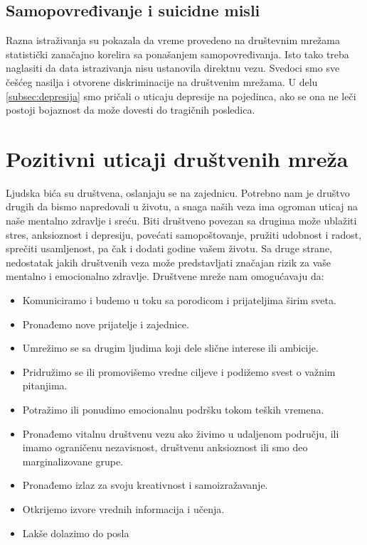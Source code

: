 \documentclass[a4paper]{article}
\begin{document}
{		\subsection{Samopovređivanje i suicidne misli}
		
		Razna istraživanja su pokazala da vreme provedeno na društevnim mrežama statistički zanačajno korelira sa ponašanjem samopovređivanja. Isto tako treba naglasiti da data istrazivanja nisu ustanovila direktnu vezu. Svedoci smo sve češćeg nasilja i otvorene diskriminacije na društvenim mrežama. U delu \eqref{subsec:depresija} smo pričali o uticaju depresije na pojedinca, ako se ona ne leči postoji bojaznost da može dovesti do tragičnih posledica.
		
		\section{Pozitivni uticaji društvenih mreža}	
		Ljudska bića su društvena, oslanjaju se na zajednicu. Potrebno nam je društvo drugih da bismo napredovali u životu, a snaga naših veza ima ogroman uticaj na naše mentalno zdravlje i sreću. Biti društveno povezan sa drugima može ublažiti stres, anksioznost i depresiju, povećati samopoštovanje, pružiti udobnost i radost, sprečiti usamljenost, pa čak i dodati godine vašem životu. Sa druge strane, nedostatak jakih društvenih veza može predstavljati značajan rizik za vaše mentalno i emocionalno zdravlje. Društvene mreže nam omogućavaju da:
		\begin{itemize}
		\item	Komuniciramo i budemo u toku sa porodicom i prijateljima širim sveta.
		\item Pronađemo nove prijatelje i zajednice.
		\item Umrežimo se sa drugim ljudima koji dele slične interese ili ambicije.
		\item Pridružimo se ili promovišemo vredne ciljeve i podižemo svest o važnim pitanjima.
		\item Potražimo ili ponudimo emocionalnu podršku tokom teških vremena.
		\item Pronađemo vitalnu društvenu vezu ako živimo u udaljenom području, ili imamo ograničenu nezavisnost, društvenu anksioznost ili smo deo marginalizovane grupe.
		\item Pronađemo izlaz za svoju kreativnost i samoizražavanje.
		\item Otkrijemo izvore vrednih informacija i učenja.
		\item Lakše dolazimo do posla
		

\end{itemize}}
\end{document}
